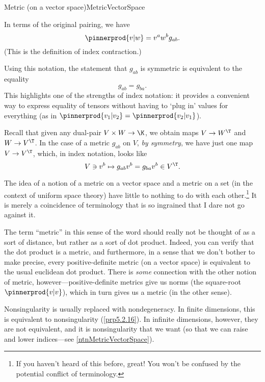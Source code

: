 \begin{dfn}{Metric (on a vector space)}{MetricVectorSpace}
\begin{rmk}
		In terms of the original pairing, we have
		\begin{equation}
			\pinnerprod{v|w}=v^aw^bg_{ab}.
		\end{equation}
		(This is the definition of index contraction.)
	\end{rmk}
	\begin{rmk}
		Using this notation, the statement that $g_{ab}$ is symmetric is equivalent to the equality
		\begin{equation}
			g_{ab}=g_{ba}.
		\end{equation}
		This highlights one of the strengths of index notation:  it provides a convenient way to express equality of tensors without having to `plug in' values for everything (as in $\pinnerprod{v_1|v_2}=\pinnerprod{v_2|v_1}$).
	\end{rmk}
	\begin{rmk}
		Recall that given any dual-pair $V\times W\rightarrow \K$, we obtain maps $V\rightarrow W^{\T}$ and $W\rightarrow V^{\T}$.  In the case of a metric $g_{ab}$ on $V$, \emph{by symmetry}, we have just one map $V\rightarrow V^{\T}$, which, in index notation, looks like
		\begin{equation}
			V\ni v^b\mapsto g_{ab}v^b=g_{ba}v^b\in V^{\T}.
		\end{equation}
	\end{rmk}
	\begin{rmk}
		The idea of a notion of a metric on a vector space and a metric on a set (in the context of uniform space theory) have little to nothing to do with each other.\footnote{If you haven't heard of this before, great!  You won't be confused by the potential conflict of terminology.}  It is merely a coincidence of terminology that is so ingrained that I dare not go against it.
		
		The term ``metric'' in this sense of the word should really not be thought of as a sort of distance, but rather as a sort of dot product.  Indeed, you can verify that the dot product is a metric, and furthermore, in a sense that we don't bother to make precise, every positive-definite metric (on a vector space) is equivalent to the usual euclidean dot product.  There is \emph{some} connection with the other notion of metric, however---positive-definite metrics give us norms (the square-root $\pinnerprod{v|v}$), which in turn gives us a metric (in the other sense).
	\end{rmk}
	\begin{rmk}
		Nonsingularity is usually replaced with nondegeneracy.  In finite dimensions, this is equivalent to nonsingularity (\cref{prp5.2.16}).  In infinite dimensions, however, they are not equivalent, and it is nonsingularity that we want (so that we can raise and lower indices---see \cref{ntnMetricVectorSpace}).
	\end{rmk}
\end{dfn}
